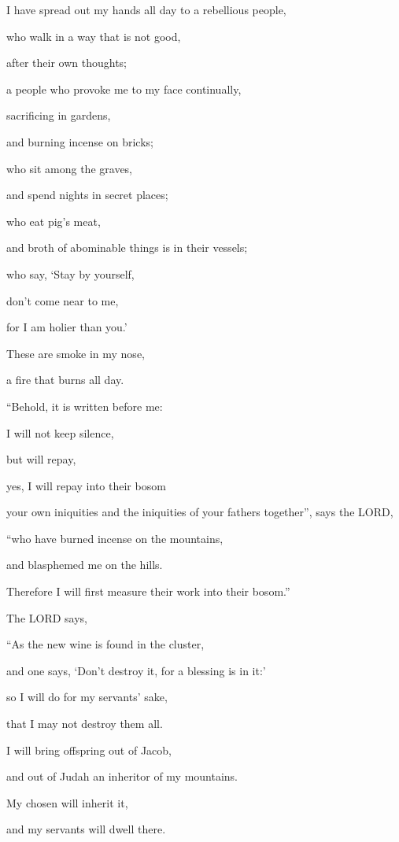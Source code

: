 \myverse{}I have spread out my hands all day to a rebellious people,

who walk in a way that is not good,

after their own thoughts;

\myverse{}a people who provoke me to my face continually,

sacrificing in gardens,

and burning incense on bricks;

\myverse{}who sit among the graves,

and spend nights in secret places;

who eat pig’s meat,

and broth of abominable things is in their vessels;

\myverse{}who say, ‘Stay by yourself,

don’t come near to me,

for I am holier than you.’

These are smoke in my nose,

a fire that burns all day.


\vspace{\baselineskip} \myverse{}“Behold, it is written before me:

I will not keep silence,

but will repay,

yes, I will repay into their bosom

\myverse{}your own iniquities and the iniquities of your fathers together”,
says the LORD,

“who have burned incense on the mountains,

and blasphemed me on the hills.

Therefore I will first measure their work into their bosom.”


\vspace{\baselineskip} \myverse{}The LORD says,

“As the new wine is found in the cluster,

and one says, ‘Don’t destroy it, for a blessing is in it:’

so I will do for my servants’ sake,

that I may not destroy them all.

\myverse{}I will bring offspring out of Jacob,

and out of Judah an inheritor of my mountains.

My chosen will inherit it,

and my servants will dwell there.

